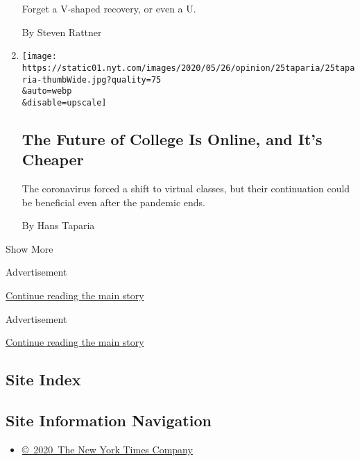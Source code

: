 \begin{enumerate}
  Forget a V-shaped recovery, or even a U.

  By Steven Rattner
\item
  \href{/2020/05/25/opinion/online-college-coronavirus.html}{}

  \texttt{[image: https://static01.nyt.com/images/2020/05/26/opinion/25taparia/25taparia-thumbWide.jpg?quality=75\\\&auto=webp\\\&disable=upscale]}

  \hypertarget{the-future-of-college-is-online-and-its-cheaper}{%
  \subsection{The Future of College Is Online, and It's
  Cheaper}\label{the-future-of-college-is-online-and-its-cheaper}}

  The coronavirus forced a shift to virtual classes, but their
  continuation could be beneficial even after the pandemic ends.

  By Hans Taparia
\end{enumerate}

Show More

Advertisement

\protect\hyperlink{after-mid1}{Continue reading the main story}

Advertisement

\protect\hyperlink{after-mktg}{Continue reading the main story}

\hypertarget{site-index}{%
\subsection{Site Index}\label{site-index}}

\hypertarget{site-information-navigation}{%
\subsection{Site Information
Navigation}\label{site-information-navigation}}

\begin{itemize}
\tightlist
\item
  \href{https://help.nytimes.com/hc/en-us/articles/115014792127-Copyright-notice}{©~2020~The
  New York Times Company}
\end{itemize}

